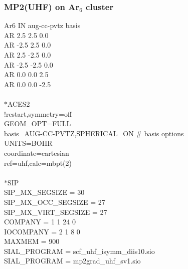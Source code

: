 \documentclass[12pt]{article}
\begin{document}
\subsubsection{MP2(UHF) on Ar$_6$ cluster}
Ar6 IN aug-cc-pvtz basis\\ 
AR  2.5  2.5  0.0\\ 
AR -2.5  2.5  0.0\\
AR  2.5 -2.5  0.0\\ 
AR -2.5 -2.5  0.0\\
AR  0.0  0.0  2.5\\
AR  0.0  0.0 -2.5\\
\\
$*$ACES2\\
!restart,symmetry=off\\
GEOM\_OPT=FULL\\
basis=AUG-CC-PVTZ,SPHERICAL=ON \# basis options\\ 
UNITS=BOHR\\
coordinate=cartesian\\ 
ref=uhf,calc=mbpt(2)\\ 
\\ 
$*$SIP\\ 
SIP\_MX\_SEGSIZE      = 30\\ 
SIP\_MX\_OCC\_SEGSIZE  = 27\\
SIP\_MX\_VIRT\_SEGSIZE = 27\\
COMPANY   = 1 1 24 0\\
IOCOMPANY = 2 1  8 0\\
MAXMEM    = 900\\
SIAL\_PROGRAM = scf\_uhf\_isymm\_diis10.sio\\ 
SIAL\_PROGRAM = mp2grad\_uhf\_sv1.sio\\ 
\\

\newpage 

\noindent 
\end{document}
